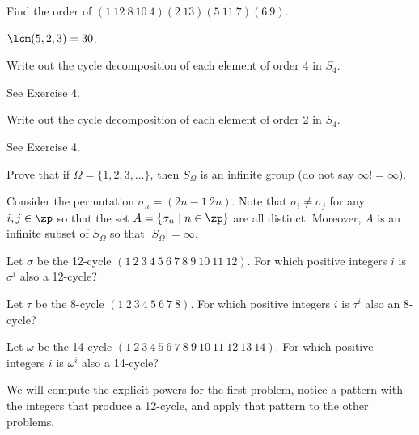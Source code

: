 \begin{problems}
    \item Find the order of $(1\ 12\ 8\ 10\ 4)(2\ 13)(5\ 11\ 7)(6\ 9)$.
    \begin{sol}
        $\lcm(5, 2, 3) = 30$.
    \end{sol}
    \item \label{ex1.3.6} Write out the cycle decomposition of each element of order 4 in $S_4$.
    \begin{sol}
        See Exercise 4.
    \end{sol}
    \item \label{ex1.3.7} Write out the cycle decomposition of each element of order 2 in $S_4$.
    \begin{sol}
        See Exercise 4.
    \end{sol}
    \item Prove that if $\Omega = \{1,2,3,\dots\}$, then $S_\Omega$ is an infinite group (do not say $\infty! = \infty$).
    \begin{sol}
        Consider the permutation $\sigma_n = (2n - 1\ 2n)$. Note that $\sigma_i \neq \sigma_j$ for any $i, j \in \zp$ so that the set $A = \{\sigma_n \mid n \in \zp\}$ are all distinct. Moreover, $A$ is an infinite subset of $S_\Omega$ so that $|S_\Omega| = \infty$.
    \end{sol}
    \item
    \begin{problems}
        \item Let $\sigma$ be the 12-cycle $(1\ 2\ 3\ 4\ 5\ 6\ 7\ 8\ 9\ 10\ 11\ 12)$. For which positive integers $i$ is $\sigma^i$ also a 12-cycle?
        \item Let $\tau$ be the 8-cycle $(1\ 2\ 3\ 4\ 5\ 6\ 7\ 8)$. For which positive integers $i$ is $\tau^i$ also an 8-cycle?
        \item Let $\omega$ be the 14-cycle $(1\ 2\ 3\ 4\ 5\ 6\ 7\ 8\ 9\ 10\ 11\ 12\ 13\ 14)$. For which positive integers $i$ is $\omega^i$ also a 14-cycle?
    \end{problems}
    \begin{solalph}
        \item We will compute the explicit powers for the first problem, notice a pattern with the integers that produce a 12-cycle, and apply that pattern to the other problems.
        

\end{solalph}
\end{problems}
